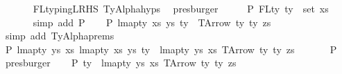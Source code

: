\begin{isabellebody}
\ \ \ \ \ \isamarkupfalse%
\ FL{\isacharunderscore}{\kern0pt}typing{\isacharunderscore}{\kern0pt}LRHS\ TyAlpha{\isachardot}{\kern0pt}hyps{\isacharparenleft}{\kern0pt}{}{\isacharparenright}{\kern0pt}\ \isamarkupfalse%
\ presburger\isanewline
\ \ \isamarkupfalse%
\ \isamarkupfalse%
\ P{}{}{\isacharcolon}{\kern0pt}\ {\isachardoublequoteopen}FLty\ ty{\isacharprime}{\kern0pt}\ {\isacharequal}{\kern0pt}\ set\ xs{\isacharprime}{\kern0pt}{\isachardoublequoteclose}\isanewline
\ \ \ \ \ \isamarkupfalse%
\ {\isacharparenleft}{\kern0pt}simp\ add{\isacharcolon}{\kern0pt}\ P{}{\isacharparenright}{\kern0pt}\isanewline
\isanewline
\ \ \isamarkupfalse%
\ P{}{}{\isacharcolon}{\kern0pt}\ {\isachardoublequoteopen}lmap{\isacharunderscore}{\kern0pt}ty\ xs{\isacharprime}{\kern0pt}\ ys{\isacharprime}{\kern0pt}\ ty{\isacharprime}{\kern0pt}\ {\isacharequal}{\kern0pt}\ TArrow\ ty{}\ ty{}\ zs{\isachardoublequoteclose}\isanewline
\ \ \ \ \ \isamarkupfalse%
\ {\isacharparenleft}{\kern0pt}simp\ add{\isacharcolon}{\kern0pt}\ TyAlpha{\isachardot}{\kern0pt}prems{\isacharparenleft}{\kern0pt}{}{\isacharparenright}{\kern0pt}{\isacharparenright}{\kern0pt}\isanewline
\ \ \isamarkupfalse%
\ P{}{}{\isacharcolon}{\kern0pt}\ {\isachardoublequoteopen}lmap{\isacharunderscore}{\kern0pt}ty\ ys{\isacharprime}{\kern0pt}\ xs{\isacharprime}{\kern0pt}\ {\isacharparenleft}{\kern0pt}lmap{\isacharunderscore}{\kern0pt}ty\ xs{\isacharprime}{\kern0pt}\ ys{\isacharprime}{\kern0pt}\ ty{\isacharprime}{\kern0pt}{\isacharparenright}{\kern0pt}\ {\isacharequal}{\kern0pt}\ lmap{\isacharunderscore}{\kern0pt}ty\ ys{\isacharprime}{\kern0pt}\ xs{\isacharprime}{\kern0pt}\ {\isacharparenleft}{\kern0pt}TArrow\ ty{}\ ty{}\ zs{\isacharparenright}{\kern0pt}{\isachardoublequoteclose}\isanewline
\ \ \ \ \ \isamarkupfalse%
\ P{}{}\ \isamarkupfalse%
\ presburger\isanewline
\ \ \isamarkupfalse%
\ P{}{}{\isacharcolon}{\kern0pt}\ {\isachardoublequoteopen}ty{\isacharprime}{\kern0pt}\ {\isacharequal}{\kern0pt}\ lmap{\isacharunderscore}{\kern0pt}ty\ ys{\isacharprime}{\kern0pt}\ xs{\isacharprime}{\kern0pt}\ {\isacharparenleft}{\kern0pt}TArrow\ ty{}\ ty{}\ zs{\isacharparenright}{\kern0pt}{\isachardoublequoteclose}\isanewline

\end{isabellebody}
